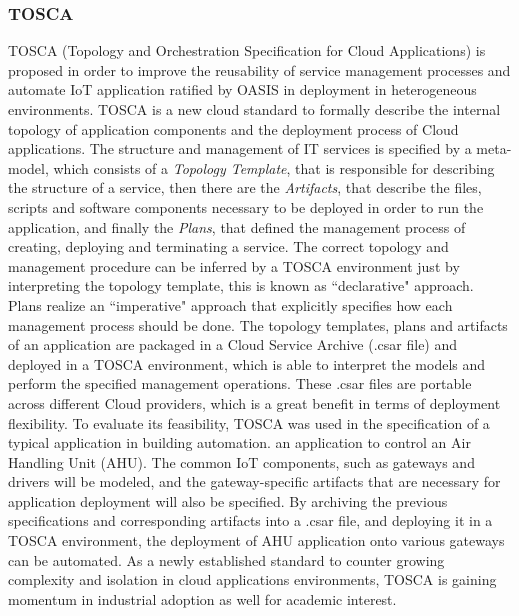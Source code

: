 \documentclass{../llncs2e/llncs}
\begin{document}
\subsubsection{TOSCA}
\label{subs:tosca}
TOSCA (Topology and Orchestration Specification for Cloud Applications) \cite{li2013towards} is
proposed in order to improve the reusability of service management processes and automate IoT application
ratified by OASIS in \cite{} deployment in heterogeneous environments. TOSCA is a new cloud standard to formally
describe the internal topology of application components and the deployment process of Cloud applications.
The structure and management of IT services is specified by a meta-model, which consists of
a \textit{Topology Template}, that is responsible for describing the structure of a service, then there
are the \textit{Artifacts}, that describe the files, scripts and software components necessary to be
deployed in order to run the application, and finally the \textit{Plans}, that defined the management process
of creating, deploying and terminating a service. The correct topology and management procedure can be inferred
by a TOSCA environment just by interpreting the topology template, this is known as ``declarative" approach.
Plans realize an ``imperative" approach that explicitly specifies how each management process should be done.
The topology templates, plans and artifacts of an application are packaged in a Cloud Service Archive (.csar file)
and deployed in a TOSCA environment, which is able to interpret the models and perform the specified management
operations. These .csar files are portable across different Cloud providers, which is a great benefit in terms
of deployment flexibility. To evaluate its feasibility, TOSCA was used in the specification of a typical
application in building automation. an application to control an Air Handling Unit (AHU). The common IoT
components, such as gateways and drivers will be modeled, and the gateway-specific artifacts that are
necessary for application deployment will also be specified. By archiving the previous specifications
and corresponding artifacts into a .csar file, and deploying it in a TOSCA environment, the deployment
of AHU application onto various gateways can be automated. As a newly established standard to counter
growing complexity and isolation in cloud applications environments, TOSCA is gaining momentum in industrial
adoption as well for academic interest.\\

\end{document}
